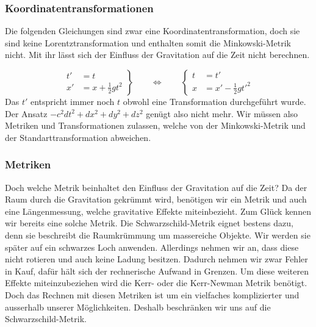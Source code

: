 \begin{refsection}
	\subsubsection{Koordinatentransformationen}
	
	Die folgenden Gleichungen sind zwar eine Koordinatentransformation, doch sie sind keine Lorentztransformation und enthalten somit die Minkowski-Metrik nicht. Mit ihr lässt sich der Einfluss der Gravitation auf die Zeit nicht berechnen. 
	
	\begin{equation}
	\left.
	\begin{aligned}
	t'&=t\\
	x'&=x+\frac12gt^2
	\end{aligned}
	\right\}
	\qquad
	\Leftrightarrow
	\qquad
	\left\{
	\begin{aligned}
	t&=t'\\
	x&=x'-\frac12gt'^2
	\end{aligned}
	\right.
	\end{equation}
	Das $t'$ entspricht immer noch $t$ obwohl eine Transformation durchgeführt wurde. 
	Der Ansatz $ -c^2dt^2 + dx^2 + dy^2 + dz^2$ genügt also nicht mehr. Wir müssen also Metriken und Transformationen zulassen, welche von der Minkowski-Metrik und der Standarttransformation abweichen.
	
	\subsubsection{Metriken}\label{skript:chapter:zeitreisen:metriken}
	
	Doch welche Metrik beinhaltet den Einfluss der Gravitation auf die Zeit? 
	Da der Raum durch die Gravitation gekrümmt wird, benötigen wir ein Metrik und auch eine Längenmessung, welche gravitative Effekte miteinbezieht.
	Zum Glück kennen wir bereits eine solche Metrik. Die Schwarzschild-Metrik eignet bestens dazu, denn sie beschreibt die Raumkrümmung um massereiche Objekte. Wir werden sie später auf ein schwarzes Loch anwenden. Allerdings nehmen wir an, dass diese nicht rotieren und auch keine Ladung besitzen. Dadurch nehmen wir zwar Fehler in Kauf, dafür hält sich der rechnerische Aufwand in Grenzen. Um diese weiteren Effekte miteinzubeziehen wird die Kerr- oder die Kerr-Newman Metrik benötigt. Doch das Rechnen mit diesen Metriken ist um ein vielfaches komplizierter und ausserhalb unserer Möglichkeiten. Deshalb beschränken wir uns auf die Schwarzschild-Metrik.


\end{refsection}
